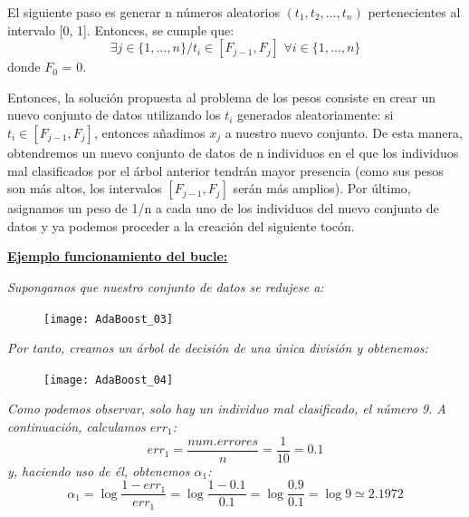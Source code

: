 \documentclass[12pt,twoside]{article}
\begin{document}
El siguiente paso es generar n números aleatorios $(t_1, t_2, \dots, t_n)$ pertenecientes al intervalo [0, 1]. Entonces, se cumple que:
\begin{equation*}
\exists j \in \{1, \dots, n \} /t_i \in [F_{j-1}, F_{j}] \, \, \forall i \in \{1, \dots, n \}
\end{equation*}
donde $F_0$ = 0.

Entonces, la solución propuesta al problema de los pesos consiste en crear un nuevo conjunto de datos utilizando los $t_i$ generados aleatoriamente: si $t_i \in [F_{j-1}, F_{j}]$, entonces añadimos $x_j$ a nuestro nuevo conjunto. De esta manera, obtendremos un nuevo conjunto de datos de n individuos en el que los individuos mal clasificados por el árbol anterior tendrán mayor presencia (como sus pesos son más altos, los intervalos $[F_{j-1}, F_{j}]$ serán más amplios). Por último, asignamos un peso de 1/n a cada uno de los individuos del nuevo conjunto de datos y ya podemos proceder a la creación del siguiente tocón.

\bigskip \bigskip \bigskip \bigskip \bigskip

\textbf{\underline{Ejemplo funcionamiento del bucle:}}

\textit{Supongamos que nuestro conjunto de datos se redujese a:}
\begin{figure}[h]
\centering
\texttt{[image: AdaBoost\_03]}
\end{figure}

\textit{Por tanto, creamos un árbol de decisión de una única división y obtenemos:}

\begin{figure}[h]
\centering
\texttt{[image: AdaBoost\_04]}
\end{figure}

\textit{Como podemos observar, solo hay un individuo mal clasificado, el número 9. A continuación, calculamos $err_1$:}
\begin{equation*}
err_1 = \frac{num.errores}{n} = \frac{1}{10} = 0.1
\end{equation*}
\noindent
\textit{y, haciendo uso de él, obtenemos $\alpha_1$:}
\begin{equation*}
\alpha_1 = \log{\frac{1 - err_1}{err_1}} = \log{\frac{1- 0.1}{0.1}} = \log{\frac{0.9}{0.1}} = \log{9} \simeq 2.1972
\end{equation*}
\end{document}
